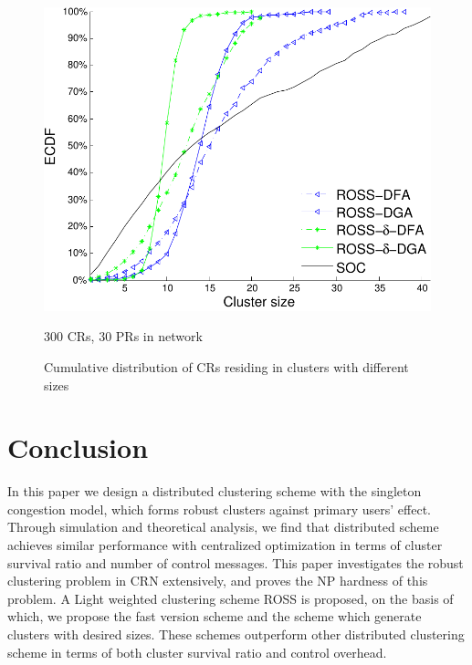\documentclass[10pt,journal,compsoc]{IEEEtran}
\theoremstyle{mytheoremstyle}
\theoremstyle{mytheoremstyle}
\theoremstyle{mytheoremstyle}
\begin{document}
\begin{figure}[t]
\begin{multicols}{3}
    \includegraphics[width=\linewidth]{cdf_clusterSize_300.pdf}\par\caption{300 CRs, 30 PRs in network}\label{cdf_clusterSize_300}
\end{multicols}
\caption{Cumulative distribution of CRs residing in clusters with different sizes}
\label{cdf_100_200_300}
\end{figure}


\section{Conclusion}
\label{conclusion}
In this paper we design a distributed clustering scheme with the singleton congestion model, which forms robust clusters against primary users' effect.
Through simulation and theoretical analysis, we find that distributed scheme achieves similar performance with centralized optimization in terms of cluster survival ratio and number of control messages.
This paper investigates the robust clustering problem in CRN extensively, and proves the NP hardness of this problem.
A Light weighted clustering scheme ROSS is proposed, on the basis of which, we propose the fast version scheme and the scheme which generate clusters with desired sizes.
These schemes outperform other distributed clustering scheme in terms of both cluster survival ratio and control overhead.

\end{document}
